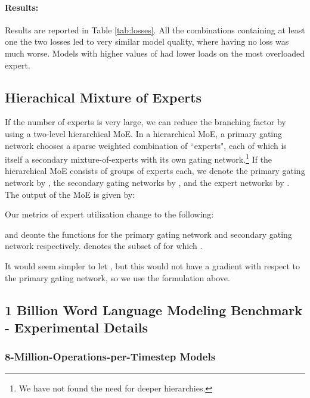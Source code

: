 \documentclass{article} \pdfoutput=1
\begin{document}
\paragraph{Results:} Results are reported in Table \ref{tab:losses}.  All the combinations containing at least one the two losses led to very similar model quality, where having no loss was much worse.  Models with higher values of  had lower loads on the most overloaded expert.





\subsection{Hierachical Mixture of Experts} \label{sec:hierarchical}  If the number of experts is very large, we can reduce the branching factor by using a two-level hierarchical MoE.  In a hierarchical MoE, a primary gating network chooses a sparse weighted combination of ``experts", each of which is itself a secondary mixture-of-experts with its own gating network.\footnote{ We have not found the need for deeper hierarchies.}  If the hierarchical MoE consists of  groups of  experts each, we denote the primary gating network by , the secondary gating networks by , and the expert networks by .   The output of the MoE is given by:



Our metrics of expert utilization change to the following:





 and  deonte the  functions for the primary gating network and  secondary gating network respectively.   denotes the subset of  for which .  

It would seem simpler to let  , but this would not have a gradient with respect to the primary gating network, so we use the formulation above.



\subsection{1 Billion Word Language Modeling Benchmark - Experimental Details}\label{sec:appendixlm1b}

\subsubsection{8-Million-Operations-per-Timestep Models}
\end{document}
